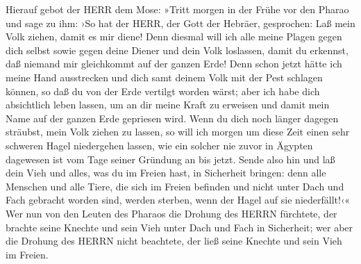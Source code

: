  Hierauf gebot der HERR dem Mose: »Tritt morgen in der
Frühe vor den Pharao und sage zu ihm: ›So hat der HERR, der Gott der
Hebräer, gesprochen: Laß mein Volk ziehen, damit es mir diene!
 Denn diesmal will ich alle meine Plagen gegen dich
selbst sowie gegen deine Diener und dein Volk loslassen, damit du
erkennst, daß niemand mir gleichkommt auf der ganzen Erde!
 Denn schon jetzt hätte ich meine Hand ausstrecken und
dich samt deinem Volk mit der Pest schlagen können, so daß du von der
Erde vertilgt worden wärst;  aber ich habe dich
absichtlich leben lassen, um an dir meine Kraft zu erweisen und damit
mein Name auf der ganzen Erde gepriesen wird.  Wenn du
dich noch länger dagegen sträubst, mein Volk ziehen zu lassen,
 so will ich morgen um diese Zeit einen sehr schweren
Hagel niedergehen lassen, wie ein solcher nie zuvor in Ägypten dagewesen
ist vom Tage seiner Gründung an bis jetzt.  Sende also
hin und laß dein Vieh und alles, was du im Freien hast, in Sicherheit
bringen: denn alle Menschen und alle Tiere, die sich im Freien befinden
und nicht unter Dach und Fach gebracht worden sind, werden sterben, wenn
der Hagel auf sie niederfällt!‹«  Wer nun von den Leuten
des Pharaos die Drohung des HERRN fürchtete, der brachte seine Knechte
und sein Vieh unter Dach und Fach in Sicherheit;  wer
aber die Drohung des HERRN nicht beachtete, der ließ seine Knechte und
sein Vieh im Freien.

